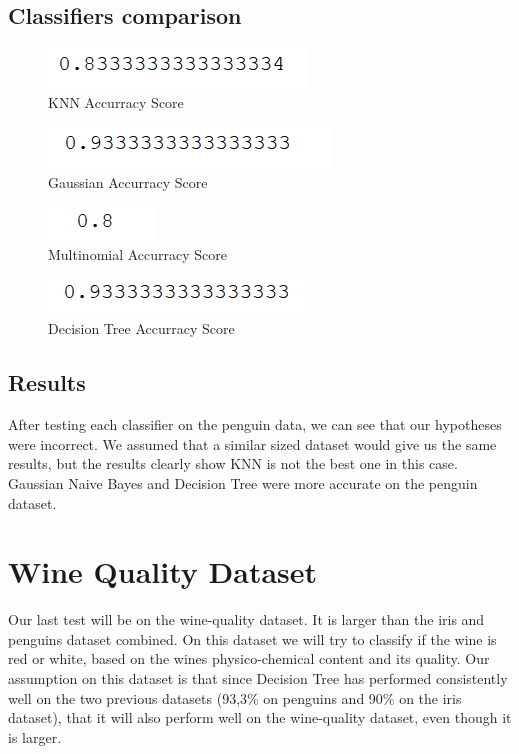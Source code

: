 \documentclass{article}
\begin{document}
\subsection{Classifiers comparison}

\begin{figure}[!h]
  \caption{KNN Accurracy Score}
  \centering
      \includegraphics[scale=0.7]{knnPenguin.png}
\end{figure}


\begin{figure}[!h]
  \centering
  \caption{Gaussian Accurracy Score}
    \includegraphics[scale=0.7]{GaussianPenguin.png}
\end{figure}


\begin{figure}[!h]
  \caption{Multinomial Accurracy Score}
  \centering
    \includegraphics[scale=0.7]{multiPenguin.png}
\end{figure}

\begin{figure}[!h]
  \caption{Decision Tree Accurracy Score}
  \centering
    \includegraphics[scale=0.7]{treePenguin.png}
\end{figure}
\FloatBarrier

\subsection{Results}
After testing each classifier on the penguin data, we can see that our hypotheses were incorrect. We assumed that a similar sized dataset would give us the same results, but the results clearly show KNN is not the best one in this case. Gaussian Naive Bayes and Decision Tree were more accurate on the penguin dataset.
\section{Wine Quality Dataset}
Our last test will be on the wine-quality dataset. It is larger than the iris and penguins dataset combined. On this dataset we will try to classify if the wine is red or white, based on the wines physico-chemical content and its quality. Our assumption on this dataset is that since Decision Tree has performed consistently well on the two previous datasets  (93,3\% on penguins and 90\% on the iris dataset), that it will also perform well on the wine-quality dataset, even though it is larger.
\end{document}
